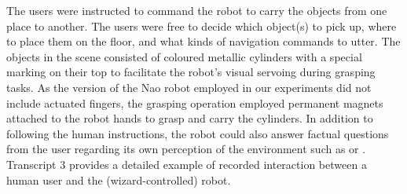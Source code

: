 The users were instructed to command the robot to carry the objects from one place to another. The users were free to decide which object(s) to pick up, where to place them on the floor, and what kinds of navigation commands to utter.  The objects in the scene consisted of coloured metallic cylinders with a special marking on their top to facilitate the robot's visual servoing during grasping tasks.  As the version of the Nao robot employed in our experiments did not include actuated fingers, the grasping operation employed permanent magnets attached to the robot hands to grasp and carry the cylinders.  In addition to following the human instructions, the robot could also answer factual questions from the user regarding its own perception of the environment such as  or . Transcript 3 provides a detailed example of recorded interaction between a human user and the (wizard-controlled) robot.


